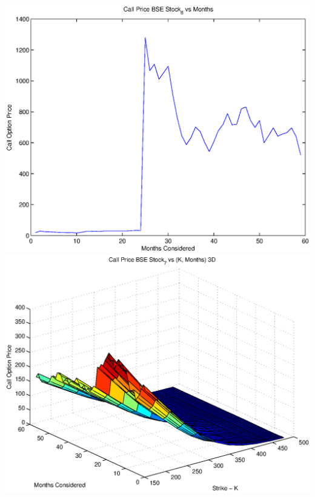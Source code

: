 \documentclass{article}
\begin{document}
\includegraphics[width=\textwidth]{Call_Price_BSE_Stock_6_vs_Months} \\

\includegraphics[width=\textwidth]{Call_Price_BSE_Stock_7_vs_(K,_Months)_3D} \\
\end{document}
